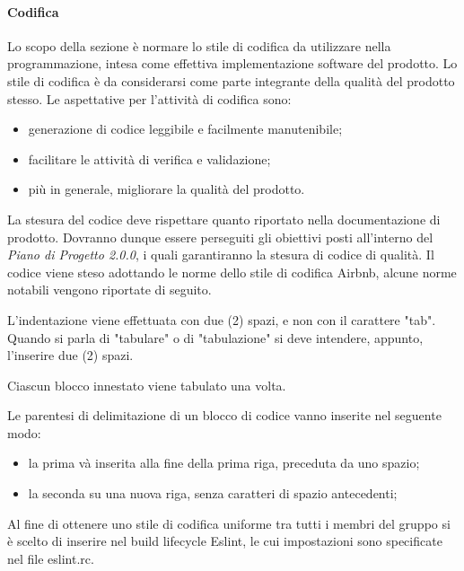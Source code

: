 		\paragraph{Codifica}
	    Lo scopo della sezione è normare lo stile di codifica da utilizzare nella programmazione, intesa come effettiva implementazione software del prodotto. Lo stile di codifica è da considerarsi come parte integrante della qualità del prodotto stesso.
	    Le aspettative per l'attività di codifica sono:
	    \begin{itemize}
	    	\item generazione di codice leggibile e facilmente manutenibile; 
	    	\item facilitare le attività di verifica e validazione;
	    	\item più in generale, migliorare la qualità del prodotto.
	    \end{itemize}
	    La stesura del codice deve rispettare quanto riportato nella documentazione di prodotto. Dovranno dunque essere perseguiti gli obiettivi posti all'interno del \textit{Piano di Progetto 2.0.0}, i quali garantiranno la stesura di codice di qualità. Il codice viene steso adottando le norme dello stile di codifica Airbnb, alcune norme notabili vengono riportate di seguito.
	    
	    L'indentazione viene effettuata con due (2) spazi, e non con il carattere "tab". Quando si parla di "tabulare" o di "tabulazione" si deve intendere, appunto, l'inserire due (2) spazi.
	    
	    Ciascun blocco innestato viene tabulato una volta.
	    
	    Le parentesi di delimitazione di un blocco di codice vanno inserite nel seguente modo:
	    \begin{itemize}
	        \item la prima và inserita alla fine della prima riga, preceduta da uno spazio;
	        \item la seconda su una nuova riga, senza caratteri di spazio antecedenti;
	    \end{itemize}

        Al fine di ottenere uno stile di codifica uniforme tra tutti i membri del gruppo si è scelto di inserire nel build lifecycle Eslint, le cui impostazioni sono specificate nel file eslint.rc.

